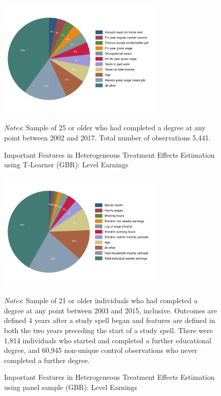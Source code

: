 \documentclass[12pt, a4paper]{article}
\begin{document}
\begin{figure}[H]
\centering
\caption{Important Features in Heterogeneous Treatment Effects Estimation using T-Learner (GBR): Level Earnings}
\vspace{0.5cm}
  \label{fig:featgbr}
    \includegraphics[width=0.7\textwidth]{_figures/influenceP_GBR_le_100.pdf}
\parbox{1\textwidth}{\footnotesize{\textit{Notes}: Sample of 25 or older who had completed a degree at any point between 2002 and 2017. Total number of observations 5,441.}}
\end{figure}


\begin{figure}[H]
\centering
\caption{Important Features in Heterogeneous Treatment Effects Estimation using panel sample (GBR): Level Earnings}
\vspace{0.5cm}
  \label{fig:featgbr_panel}
    \includegraphics[width=0.7\textwidth]{_figures/influenceP_GBR_csnopoly.pdf}
\parbox{1\textwidth}{\footnotesize{\textit{Notes}: Sample of 21 or older individuals who had completed a degree at any point between 2003 and 2015, inclusive. Outcomes are defined 4 years after a study spell began and features are defined in both the two years preceding the start of a study spell. There were 1,814 individuals who started and completed a further educational degree, and 60,945 non-unique control observations who never completed a further degree.}}
\end{figure}
\end{document}
